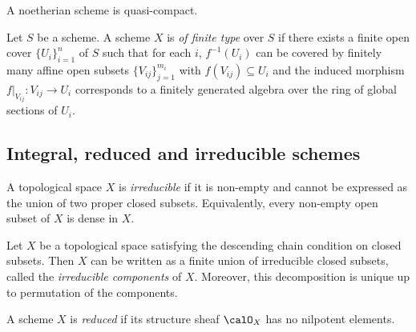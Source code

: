     \begin{proposition}\label{prop:noetherian_scheme_is_quasi_compact}
        A noetherian scheme is quasi-compact.
    \end{proposition}

    \begin{definition}\label{def:scheme_of_finite_type_over_base_scheme}
        Let \(S\) be a scheme.
        A scheme \(X\) is \emph{of finite type} over \(S\) if there exists a finite open cover \(\{U_i\}_{i=1}^n\) of \(S\) such that for each \(i\), \(f^{-1}(U_i)\) can be covered by finitely many affine open subsets \(\{V_{ij}\}_{j=1}^{m_i}\) with \(f(V_{ij}) \subseteq U_i\) and the induced morphism \(f|_{V_{ij}} : V_{ij} \to U_i\) corresponds to a finitely generated algebra over the ring of global sections of \(U_i\).

    \end{definition}


\subsection{Integral, reduced and irreducible schemes}

    \begin{definition}\label{def:irreducible_topological_space}
        A topological space \(X\) is \emph{irreducible} if it is non-empty and cannot be expressed as the union of two proper closed subsets.
        Equivalently, every non-empty open subset of \(X\) is dense in \(X\).
    \end{definition}

    \begin{proposition}\label{prop:irreducible_components_and_primary_decomposition}
        Let \(X\) be a topological space satisfying the descending chain condition on closed subsets.
        Then \(X\) can be written as a finite union of irreducible closed subsets, called the \emph{irreducible components} of \(X\).
        Moreover, this decomposition is unique up to permutation of the components.
    \end{proposition}

    \begin{definition}\label{def:reduced_scheme}
        A scheme \(X\) is \emph{reduced} if its structure sheaf \(\calO_X\) has no nilpotent elements.
    \end{definition}

